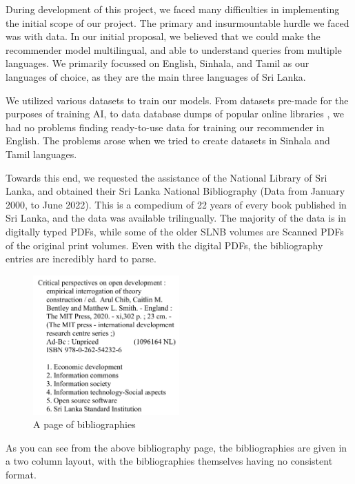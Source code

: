 During development of this project, we faced many difficulties in implementing the initial scope of our project. The primary and insurmountable hurdle we faced was with data. In our initial proposal, we believed that we could make the recommender model multilingual, and able to understand queries from multiple languages. We primarily focussed on English, Sinhala, and Tamil as our languages of choice, as they are the main three languages of Sri Lanka.

We utilized various datasets to train our models. From datasets pre-made for the purposes of training AI, to data database dumps of popular online libraries \cite{goodbooks-10k-extended}, we had no problems finding ready-to-use data for training our recommender in English. The problems arose when we tried to create datasets in Sinhala and Tamil languages.

Towards this end, we requested the assistance of the National Library of Sri Lanka, and obtained their Sri Lanka National Bibliography \cite{sri_lanka_national_bibliography} (Data from January 2000, to June 2022). This is a compedium of 22 years of every book published in Sri Lanka, and the data was available trilingually. The majority of the data is in digitally typed PDFs, while some of the older SLNB volumes are Scanned PDFs of the original print volumes. Even with the digital PDFs, the bibliography entries are incredibly hard to parse.

\begin{figure}[htbp]
    \centering
    \includegraphics[width=0.5\textwidth]{../../assets/snlb_entry.png}
    \caption{A page of bibliographies}
    \label{fig:slnbpage}
\end{figure}

As you can see from the above bibliography page, the bibliographies are given in a two column layout, with the bibliographies themselves having no consistent format.

